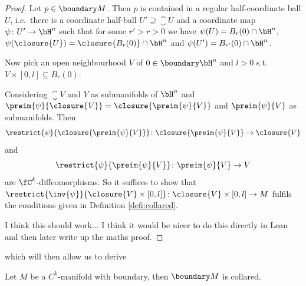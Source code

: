 \begin{proof}
    Let $p \in \boundary M$. Then $p$ is contained in a regular half-coordinate ball $U$, i.e.\ there is a coordinate half-ball $U' \supseteq \closure{U}$ and a coordinate map $\psi \colon U' \to \bH^n$ such that for some $r' > r > 0$ we have $\psi(U) = B_r(0) \cap \bH^n$, $\psi (\closure{U}) = \closure{B_r(0)} \cap \bH^n$ and $\psi (U') = B_{r'}(0) \cap \bH^n$. 

    Now pick an open neighbourhood $V$ of $0 \in \boundary \bH^n$ and $l > 0$ s.t. $V \times [0, l] \subseteq B_r(0)$.

    Considering $\closure{V}$ and $V$ as submanifolds of $\bH^n$ and $\preim{\psi}{\closure{V}} = \closure{\preim{\psi}{V}}$ and $\preim{\psi}{V}$ as submanifolds. 
    Then 
    \begin{equation*}
        \restrict{\psi}{\closure{\preim{\psi}{V}}} \colon \closure{\preim{\psi}{V}} \to \closure{V}
    \end{equation*}
    and 
    \begin{equation*}
        \restrict{\psi}{\preim{\psi}{V}} \colon \preim{\psi}{V} \to V
    \end{equation*}
    are $\fC^k$-diffeomorphisms. 
    So it suffices to show that $\restrict{\inv{\psi}}{\closure{V} \times [0, l]} \colon \closure{V} \times [0, l] \to M$ fulfils the conditions given in Definition \ref{defi:collared}. 

    I think this should work... 
    I think it would be nicer to do this directly in Lean and then later write up the maths proof. 
\end{proof}

which will then allow us to derive

\begin{thm}
    Let $M$ be a $C^k$-manifold with boundary, then $\boundary M$ is collared. 
\end{thm}

